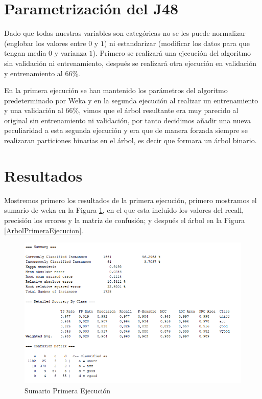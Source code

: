\documentclass[a4paper, 11pt, twoside, openany, onecolumn, final]{memoir}
\begin{document}
	\section{Parametrización del J48}
		Dado que todas nuestras variables son categóricas no se les puede normalizar (englobar los valores entre $0$ y $1$) ni estandarizar (modificar los datos para que tengan media $0$ y varianza $1$). 
		Primero se realizará una ejecución del algoritmo sin validación ni entrenamiento, después se realizará otra ejecución en validación y entrenamiento al $66\%$.
		
		En la primera ejecución se han mantenido los parámetros del algoritmo predeterminado por Weka y en la segunda ejecución al realizar un entrenamiento y una validación al $66\%$, vimos que el árbol resultante era muy parecido al original sin entrenamiento ni validación, por tanto decidimos añadir una nueva peculiaridad a esta segunda ejecución y era que de manera forzada siempre se realizaran particiones binarias en el árbol, es decir que formara un árbol binario.
	\section{Resultados}
	Mostremos primero los resultados de la primera ejecución, primero mostramos el sumario de weka en la Figura \ref{SumarioPrimeraEjecucion}, en el que esta incluido los valores del recall, precisión los errores y la matriz de confusión; y después el árbol en la Figura \ref{ArbolPrimeraEjecucion}.
	\begin{figure}
  		\centering
   		\includegraphics{Imagenes/SummarySinEntreNiVal}
  		\caption{Sumario Primera Ejecución}
  		\label{SumarioPrimeraEjecucion}
	\end{figure}	
	
\end{document}
